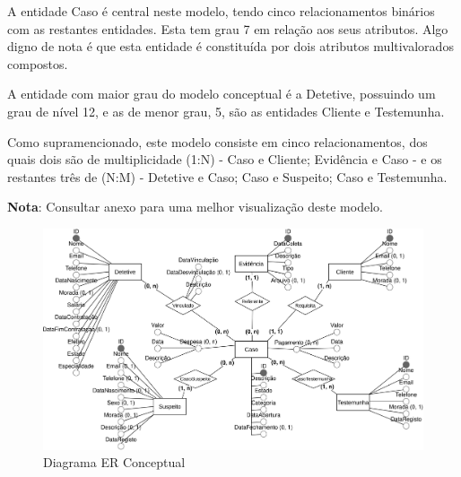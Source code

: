 \documentclass[a4paper,12pt]{scrreprt}
\begin{document}
        A entidade Caso é central neste modelo, tendo cinco relacionamentos binários com as restantes entidades. Esta tem grau 7 em relação aos seus atributos. Algo digno de nota é que esta entidade é constituída por dois atributos multivalorados compostos.

        A entidade com maior grau do modelo conceptual é a Detetive, possuindo um grau de nível 12, e as de menor grau, 5, são as entidades Cliente e Testemunha.

        Como supramencionado, este modelo consiste em cinco relacionamentos, dos quais dois são de multiplicidade (1:N) - Caso e Cliente; Evidência e Caso - e os restantes três de (N:M) - Detetive e Caso; Caso e Suspeito; Caso e Testemunha.

        \textbf{Nota}: Consultar anexo \textit{} para uma melhor visualização deste modelo.

        
        \clearpage
        \begin{figure}[!ht]
            \centering
            \includegraphics[scale=1.05, angle=270]{images/conceptual.png}
            \caption{Diagrama ER Conceptual}
            \label{fig:3.1}
        \end{figure}
        


\end{document}
